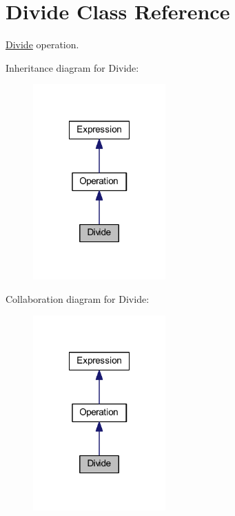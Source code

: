 \hypertarget{class_divide}{\section{Divide Class Reference}
\label{class_divide}
}


\hyperlink{class_divide}{Divide} operation.  




Inheritance diagram for Divide\-:\nopagebreak
\begin{figure}[H]
\begin{center}
\leavevmode
\includegraphics[width=144pt]{class_divide__inherit__graph}
\end{center}
\end{figure}


Collaboration diagram for Divide\-:\nopagebreak
\begin{figure}[H]
\begin{center}
\leavevmode
\includegraphics[width=144pt]{class_divide__coll__graph}
\end{center}
\end{figure}
